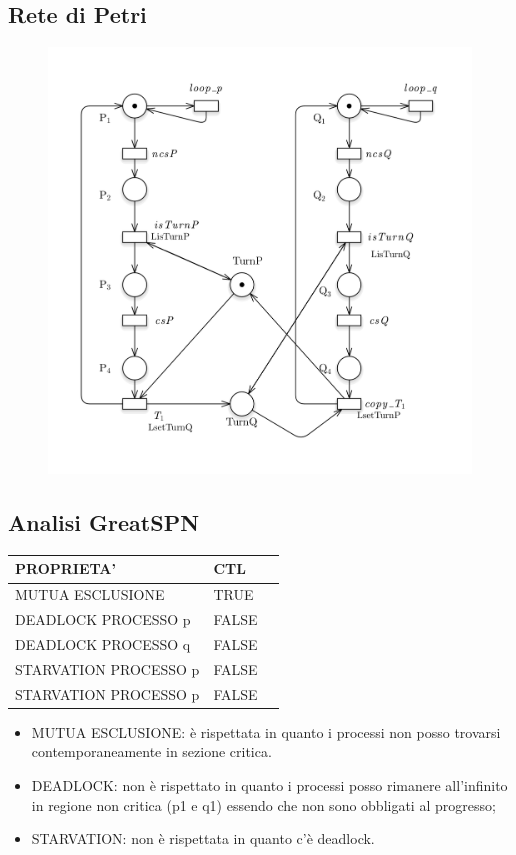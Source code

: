\documentclass{article}
\begin{document}
\subsection{Rete di Petri}
\begin{figure}[h] 
\centering
\includegraphics[scale=0.5]{3.2PT.png}
\end{figure}
\subsection{Analisi GreatSPN}
\begin{tabular}{ |p{6cm}||p{3cm}|p{3cm}|}
 \hline
 PROPRIETA'& CTL\\
 \hline
 MUTUA ESCLUSIONE&TRUE \\
 DEADLOCK PROCESSO p&FALSE \\
 DEADLOCK PROCESSO q&FALSE\\
 STARVATION PROCESSO p&FALSE\\
 STARVATION PROCESSO p&FALSE\\
\hline
\end{tabular}
\begin{itemize}
    \item MUTUA ESCLUSIONE: è rispettata in quanto i processi non posso trovarsi contemporaneamente in sezione critica.
    \item DEADLOCK: non è rispettato in quanto i processi posso rimanere all'infinito in regione non critica (p1 e q1) essendo che non sono obbligati al progresso;
    \item STARVATION: non è rispettata in quanto c'è deadlock.
\end{itemize}
\clearpage
\end{document}
